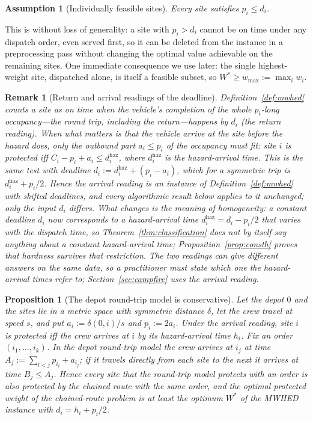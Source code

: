 \documentclass[pdflatex,sn-mathphys-ay]{sn-jnl}
\theoremstyle{thmstyleone}
\newtheorem{proposition}[theorem]{Proposition}
\theoremstyle{thmstyletwo}
\newtheorem{assumption}{Assumption}
\newtheorem{remark}{Remark}
\theoremstyle{thmstylethree}
\begin{document}
\begin{assumption}[Individually feasible sites]\label{as:feasible}
Every site satisfies $p_i \le d_i$.
\end{assumption}

This is without loss of generality: a site with $p_i > d_i$ cannot be
on time under any dispatch order, even served first, so it can be
deleted from the instance in a preprocessing pass without changing the
optimal value achievable on the remaining sites. One immediate
consequence we use later: the single highest-weight site, dispatched
alone, is itself a feasible subset, so $W^\ast \ge w_{\max} := \max_i
w_i$.

\begin{remark}[Return and arrival readings of the deadline]\label{rem:reading}
Definition~\ref{def:mwhed} counts a site as on time when the vehicle's
\emph{completion} of the whole $p_i$-long occupancy---the round trip,
including the return---happens by $d_i$ (the \emph{return reading}).
When what matters is that the vehicle \emph{arrive} at the site before
the hazard does, only the outbound part $a_i\le p_i$ of the occupancy
must fit: site $i$ is protected iff $C_i-p_i+a_i\le d_i^{\mathrm{haz}}$,
where $d_i^{\mathrm{haz}}$ is the hazard-arrival time. This is the same
test with deadline $d_i:=d_i^{\mathrm{haz}}+(p_i-a_i)$, which for a
symmetric trip is $d_i^{\mathrm{haz}}+p_i/2$. Hence the \emph{arrival
reading} is an instance of Definition~\ref{def:mwhed} with shifted
deadlines, and every \emph{algorithmic} result below applies to it
unchanged; only the input $d_i$ differs. What changes is the meaning of
homogeneity: a constant deadline $d_i$ now corresponds to a hazard-arrival
time $d_i^{\mathrm{haz}}=d_i-p_i/2$ that varies with the dispatch time, so
Theorem~\ref{thm:classification} does not by itself say anything about a
constant hazard-arrival time; Proposition~\ref{prop:consth} proves that
hardness survives that restriction. The two readings can give different answers on the
same data, so a practitioner must state which one the hazard-arrival
times refer to; Section~\ref{sec:campfire} uses the arrival reading.
\end{remark}

\begin{proposition}[The depot round-trip model is conservative]\label{prop:spoke}
Let the depot $0$ and the sites lie in a metric space with symmetric
distance $\delta$, let the crew travel at speed $s$, and put
$a_i:=\delta(0,i)/s$ and $p_i:=2a_i$. Under the arrival reading, site $i$
is protected iff the crew arrives at $i$ by its hazard-arrival time
$h_i$. Fix an order $(i_1,\dots,i_k)$. In the depot round-trip model the
crew arrives at $i_j$ at time $A_j:=\sum_{l<j}p_{i_l}+a_{i_j}$; if it
travels directly from each site to the next it arrives at time
$B_j\le A_j$. Hence every site that the round-trip model protects with an
order is also protected by the chained route with the same order, and the
optimal protected weight of the chained-route problem is at least the
optimum $W^\ast$ of the MWHED instance with $d_i=h_i+p_i/2$.
\end{proposition}
\end{document}
